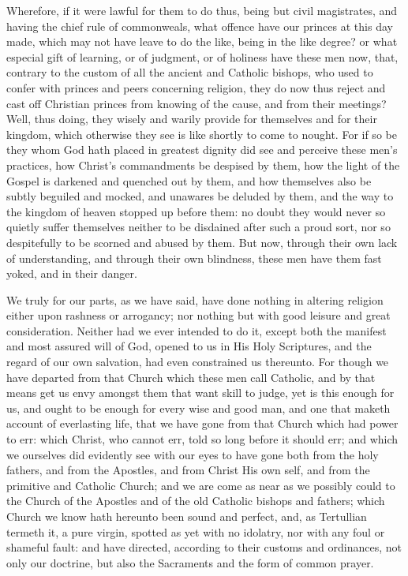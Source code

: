 Wherefore, if it were lawful for them to do thus, being but civil
magistrates, and having the chief rule of commonweals, what offence
have our princes at this day made, which may not have leave to do the
like, being in the like degree? or what especial gift of learning, or
of judgment, or of holiness have these men now, that, contrary to the
custom of all the ancient and Catholic bishops, who used to confer with
princes and peers concerning religion, they do now thus reject and cast
off Christian princes from knowing of the cause, and from their meetings?
Well, thus doing, they wisely and warily provide for themselves and
for their kingdom, which otherwise they see is like shortly to come
to nought. For if so be they whom God hath placed in greatest
dignity did see and perceive these men’s practices, how Christ’s
commandments be despised by them, how the light of
the Gospel is darkened and quenched out by them, and how themselves
also be subtly beguiled and mocked, and unawares be deluded by them,
and the way to the kingdom of heaven stopped up before them: no doubt
they would never so quietly suffer themselves neither to be disdained
after such a proud sort, nor so despitefully to be scorned and abused
by them. But now, through their own lack of understanding, and
through their own blindness, these men have them fast yoked, and in
their danger.

We truly for our parts, as we have said, have done nothing in altering
religion either upon rashness or arrogancy; nor nothing but with good
leisure and great consideration. Neither had we ever intended
to do it, except both the manifest and most assured will of God, opened
to us in His Holy Scriptures, and the regard of our own salvation, had
even constrained us thereunto. For though we have departed from
that Church which these men call Catholic, and by that means get us
envy amongst them that want skill to judge, yet is this enough for us,
and ought to be enough for every wise and good man, and one that maketh
account of everlasting life, that we have gone from that Church which
had power to err: which Christ, who
cannot err, told so long before it should err; and which we ourselves
did evidently see with our eyes to have gone both from the holy fathers,
and from the Apostles, and from Christ His own self, and from the primitive
and Catholic Church; and we are come as near as we possibly could to
the Church of the Apostles and of the old Catholic bishops and fathers;
which Church we know hath hereunto been sound and perfect, and, as Tertullian
termeth it, a pure virgin, spotted as yet with no idolatry, nor with
any foul or shameful fault: and have directed, according to their customs
and ordinances, not only our doctrine, but also the Sacraments and the
form of common prayer.

